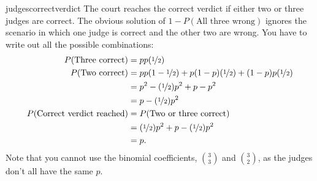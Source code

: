 \begin{answer}{judgescorrectverdict}
The court reaches the correct verdict if either two or three judges are correct.
The obvious solution of $1 - P(\text{All three wrong})$ ignores the scenario in which one judge is correct and the other two are wrong.
You have to write out all the possible combinations:
\begin{align*}
  P(\text{Three correct})  &= p p  (\nicefrac{1}{2}) \\
  P( \text{Two correct} ) &=
     p         p     (1-\nicefrac{1}{2}) +
     p       (1-p)   (\nicefrac{1}{2}) +
   (1-p)       p     (\nicefrac{1}{2}) \\
  &= p^2 - (\nicefrac{1}{2})p^2 + p-p^2 \\
  &= p - (\nicefrac{1}{2})p^2  \\
   P(\text{Correct verdict reached})
  &=
   P(\text{Two or three correct}) \\
  &= (\nicefrac{1}{2})p^2   + p - (\nicefrac{1}{2})p^2  \\
  &=  p
  \text{.}
\end{align*}
Note that you cannot use the binomial coefficients,
$\binom{3}{3}$
and
$\binom{3}{2}$,
as the judges don't all have the same $p$.
\end{answer}

